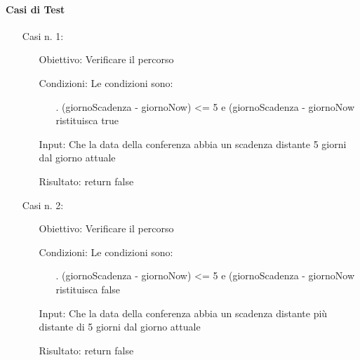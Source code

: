 \paragraph{Casi di Test}
\begin{itemize}
\item[Casi n. 1:]
\begin{itemize}
\item[Obiettivo:] Verificare il percorso 
\item[Condizioni:] Le condizioni sono:
\begin{itemize}
\item[.] (giornoScadenza - giornoNow) <= 5 e  (giornoScadenza - giornoNow ristituisca true
\end{itemize}
\item[Input:]  Che la data della conferenza abbia un scadenza distante 5 giorni dal giorno attuale
\item[Risultato:] return false
\end{itemize}
\item[Casi n. 2:]
\begin{itemize}
\item[Obiettivo:] Verificare il percorso 
\item[Condizioni:] Le condizioni sono:
\begin{itemize}
\item[.] (giornoScadenza - giornoNow) <= 5 e (giornoScadenza - giornoNow ristituisca false
\end{itemize}
\item[Input:] Che la data della conferenza abbia un scadenza distante più distante di 5 giorni dal giorno attuale
\item[Risultato:] return false
\end{itemize}
\end{itemize}





